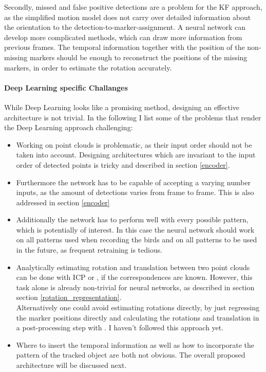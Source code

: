 \documentclass[12pt,a4paper]{article}
\begin{document}
Secondly, missed and false positive detections are a problem for the KF approach, as the simplified motion model does not carry over detailed information about the orientation to the detection-to-marker-assignment. A neural network can develop more complicated methods, which can draw more information from previous frames. The temporal information together with the position of the non-missing markers should be enough to reconstruct the positions of the missing markers, in order to estimate the rotation accurately.

\paragraph{Deep Learning specific Challanges} While Deep Learning looks like a promising method, designing an effective architecture is not trivial. In the following I list some of the problems that render the Deep Learning approach challenging:
\begin{itemize}
	\item Working on point clouds is problematic, as their input order should not be taken into account. Designing architectures which are invariant to the input order of detected points is tricky and described in section \ref{encoder}.
	\item Furthermore the network has to be capable of accepting a varying number inputs, as the amount of detections varies from frame to frame. This is also addressed in section \ref{encoder}
	\item Additionally the network has to perform well with every possible pattern, which is potentially of interest. In this case the neural network should work on all patterns used when recording the birds and on all patterns to be used in the future, as frequent retraining is tedious.
	\item Analytically estimating rotation and translation between two point clouds can be done with ICP or \cite{umeyama}, if the correspondences are known. However, this task alone is already non-trivial for neural networks, as described in section section \ref{rotation_representation}.\\
	Alternatively one could avoid estimating rotations directly, by just regressing the marker positions directly and calculating the rotations and translation in a post-processing step with \cite{umeyama}. I haven't followed this approach yet.
	\item Where to insert the temporal information as well as how to incorporate the pattern of the tracked object are both not obvious. The overall proposed architecture will be discussed next.

\end{itemize}
\end{document}
